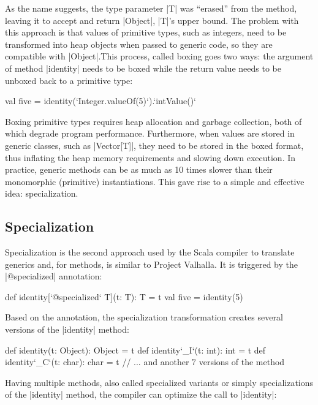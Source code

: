 As the name suggests, the type parameter |T| was ``erased'' from the method, leaving it to accept and return |Object|, |T|'s upper bound. The problem with this approach is that values of primitive types, such as integers, need to be transformed into heap objects when passed to generic code, so they are compatible with |Object|.This process, called boxing goes two ways: the argument of method |identity| needs to be boxed while the return value needs to be unboxed back to a primitive type:

\begin{lstlisting-nobreak}
 val five = identity(`Integer.valueOf(5)`).`intValue()`
\end{lstlisting-nobreak}

Boxing primitive types requires heap allocation and garbage collection, both of which degrade program performance. Furthermore, when values are stored in generic classes, such as |Vector[T]|, they need to be stored in the boxed format, thus inflating the heap memory requirements and slowing down execution. In practice, generic methods can be as much as 10 times slower than their monomorphic (primitive) instantiations. This gave rise to a simple and effective idea: specialization.

\subsection{Specialization}

Specialization \cite{specialization-iuli, iuli-thesis} is the second approach used by the Scala compiler to translate generics and, for methods, is similar to Project Valhalla. It is triggered by the |@specialized| annotation:

\begin{lstlisting-nobreak}
 def identity[`@specialized` T](t: T): T = t
 val five = identity(5)
\end{lstlisting-nobreak}

Based on the annotation, the specialization transformation creates several versions of the |identity| method:

\begin{lstlisting-nobreak}
 def identity(t: Object): Object = t
 def identity`_I`(t: int): int = t
 def identity`_C`(t: char): char = t
 // ... and another 7 versions of the method
\end{lstlisting-nobreak}

Having multiple methods, also called specialized variants or simply specializations of the |identity| method, the compiler can optimize the call to |identity|:

